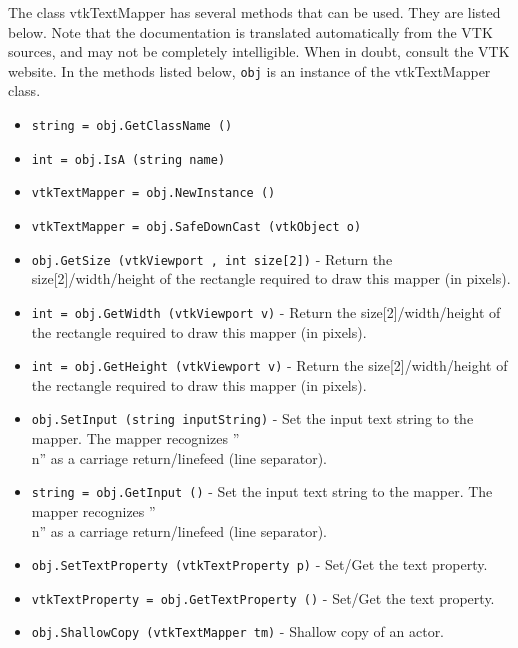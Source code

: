 The class vtkTextMapper has several methods that can be used.
  They are listed below.
Note that the documentation is translated automatically from the VTK sources,
and may not be completely intelligible.  When in doubt, consult the VTK website.
In the methods listed below, \verb|obj| is an instance of the vtkTextMapper class.
\begin{itemize}
\item  \verb|string = obj.GetClassName ()|

\item  \verb|int = obj.IsA (string name)|

\item  \verb|vtkTextMapper = obj.NewInstance ()|

\item  \verb|vtkTextMapper = obj.SafeDownCast (vtkObject o)|

\item  \verb|obj.GetSize (vtkViewport , int size[2])| -  Return the size[2]/width/height of the rectangle required to draw this
 mapper (in pixels).

\item  \verb|int = obj.GetWidth (vtkViewport v)| -  Return the size[2]/width/height of the rectangle required to draw this
 mapper (in pixels).

\item  \verb|int = obj.GetHeight (vtkViewport v)| -  Return the size[2]/width/height of the rectangle required to draw this
 mapper (in pixels).

\item  \verb|obj.SetInput (string inputString)| -  Set the input text string to the mapper.  The mapper recognizes ''\\n''
 as a carriage return/linefeed (line separator).

\item  \verb|string = obj.GetInput ()| -  Set the input text string to the mapper.  The mapper recognizes ''\\n''
 as a carriage return/linefeed (line separator).

\item  \verb|obj.SetTextProperty (vtkTextProperty p)| -  Set/Get the text property.

\item  \verb|vtkTextProperty = obj.GetTextProperty ()| -  Set/Get the text property.

\item  \verb|obj.ShallowCopy (vtkTextMapper tm)| -  Shallow copy of an actor.


\end{itemize}
